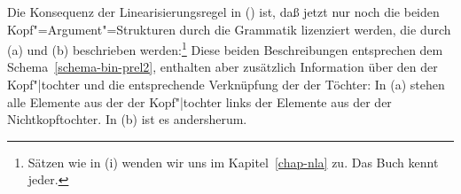 Die Konsequenz der Linearisierungsregel in () ist, daß jetzt nur noch die beiden 
Kopf"=Argument"=Strukturen durch die Grammatik lizenziert werden, die durch (a) und
(b) beschrieben werden:\footnote{
  Sätzen wie in (i) wenden wir uns im Kapitel~\ref{chap-nla} zu.
  \ea
  Das Buch kennt jeder.
  \zlast
}
\eal
\ex {}
\ex {}
\zl
Diese beiden Beschreibungen entsprechen dem Schema~\ref{schema-bin-prel2},
enthalten aber zusätzlich Information über den \initialw der
Kopf"|tochter und die entsprechende Verknüpfung der \phonwe
der Töchter: In (a) stehen alle Elemente aus der \phonl der Kopf"|tochter
links der Elemente aus der \phonl der Nichtkopftochter. In (b)
ist es andersherum.

